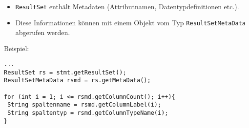 \begin{frame}[fragile]\frametitle{\insertsection}
\framesubtitle{\insertsubsection}
\\[4pt]
\begin{itemize}
\item \texttt{ResultSet} enthält Metadaten (Attributnamen, Datentypdefinitionen etc.).
\item Diese Informationen können mit einem Objekt vom Typ \texttt{ResultSetMetaData} abgerufen werden.
\end{itemize}
Beispiel:
\lstset{language=Java}
\begin{lstlisting}[xleftmargin=3ex, numbers=none]
...
ResultSet rs = stmt.getResultSet(); 
ResultSetMetaData rsmd = rs.getMetaData(); 

for (int i = 1; i <= rsmd.getColumnCount(); i++){
 String spaltenname = rsmd.getColumnLabel(i);
 String spaltentyp = rsmd.getColumnTypeName(i);
}
\end{lstlisting}
\end{frame}

